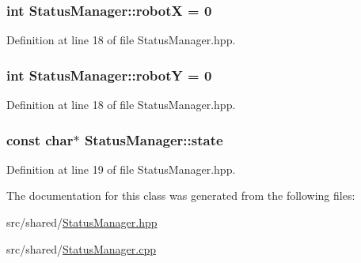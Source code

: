 \hypertarget{classStatusManager_a844d999c234bdcfcb0f465bdf2da9b72}{
\subsubsection[{robot\-X}]{\setlength{\rightskip}{0pt plus 5cm}int Status\-Manager\-::robot\-X = 0\hspace{0.3cm}{\ttfamily [static]}}}\label{classStatusManager_a844d999c234bdcfcb0f465bdf2da9b72}


Definition at line 18 of file Status\-Manager.\-hpp.

\hypertarget{classStatusManager_a2e09a9dcfcc6c38cae621c04f49c58b4}{
\subsubsection[{robot\-Y}]{\setlength{\rightskip}{0pt plus 5cm}int Status\-Manager\-::robot\-Y = 0\hspace{0.3cm}{\ttfamily [static]}}}\label{classStatusManager_a2e09a9dcfcc6c38cae621c04f49c58b4}


Definition at line 18 of file Status\-Manager.\-hpp.

\hypertarget{classStatusManager_a6f3c0467116c3bfbf9d7507cb04b7d5a}{
\subsubsection[{state}]{\setlength{\rightskip}{0pt plus 5cm}const char$\ast$ Status\-Manager\-::state\hspace{0.3cm}{\ttfamily [static]}}}\label{classStatusManager_a6f3c0467116c3bfbf9d7507cb04b7d5a}


Definition at line 19 of file Status\-Manager.\-hpp.



The documentation for this class was generated from the following files\-:\begin{DoxyCompactItemize}
\item 
src/shared/\hyperlink{StatusManager_8hpp}{Status\-Manager.\-hpp}\item 
src/shared/\hyperlink{StatusManager_8cpp}{Status\-Manager.\-cpp}\end{DoxyCompactItemize}
